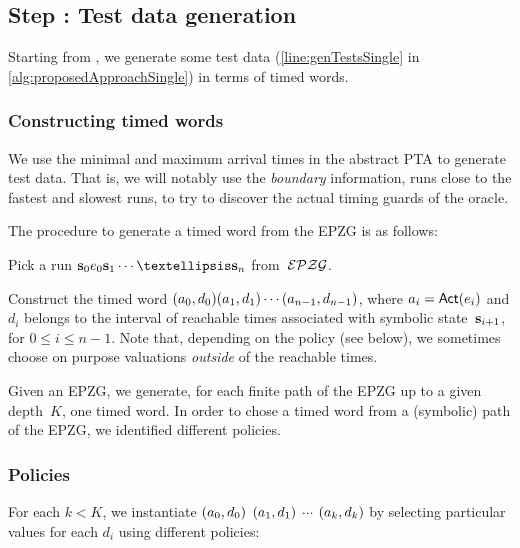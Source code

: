 \begin{tikzborder}{\cite{Gargantini16:validation}}
\begin{tikzborder}{\cite{gargantini_combinatorial_2017}}
\begin{tikzborder}{\cite{gargantini_combinatorial_2017}}
\begin{tikzborder}{\cite{garn2019}}
\begin{tikzborder}{\cite{arcaini2019achieving}}
\begin{tikzborder}{\cite{arcaini2019varivolution}}
\subsection{Step : Test data generation}\label{sec:testDataGen}
\begin{tikzborder}{}
Starting from \epzg, we generate some test data (\ref{line:genTestsSingle} in \ref{alg:proposedApproachSingle}) in terms of timed words.
\end{tikzborder}

\subsubsection{Constructing timed words}
\begin{tikzborder}{}
We use the minimal and maximum arrival times in the abstract PTA to generate test data.
That is, we will notably use the \emph{boundary} information, \ie{} runs close to the fastest and slowest runs, to try to discover the actual timing guards of the oracle.

The procedure to generate a timed word from the EPZG is as follows:
\begin{compactenum}
	\item Pick a run $\symbstate_0 \edge_0 \symbstate_1 \cdots … \symbstate_n$ from~$\mathcal{EPZG}$.
	\item Construct the timed word $(a_0, d_0) (a_1, d_1) \cdots (a_{n-1}, d_{n-1})$, where $a_i = \mathsf{Act}(e_i)$ and $d_i$ belongs to the interval of reachable times associated with symbolic state~$\mathbf{s}_{i+1}$, for $0 \leq i \leq n - 1$.
	Note that, depending on the policy (see below), we sometimes choose on purpose valuations \emph{outside} of the reachable times.
\end{compactenum}

Given an EPZG, we generate, for each finite path of the EPZG up to a given depth~$K$, one timed word.
In order to chose a timed word from a (symbolic) path of the EPZG, we identified different policies.
\end{tikzborder}

\subsubsection{Policies}
\begin{tikzborder}{}
For each $k < K$, we instantiate $(a_0, d_0)$ $(a_1, d_1)$ $\cdots$ $(a_k, d_k)$ by selecting particular values for each $d_i$ using different policies:


\end{tikzborder}
\end{tikzborder}
\end{tikzborder}
\end{tikzborder}
\end{tikzborder}
\end{tikzborder}
\end{tikzborder}
